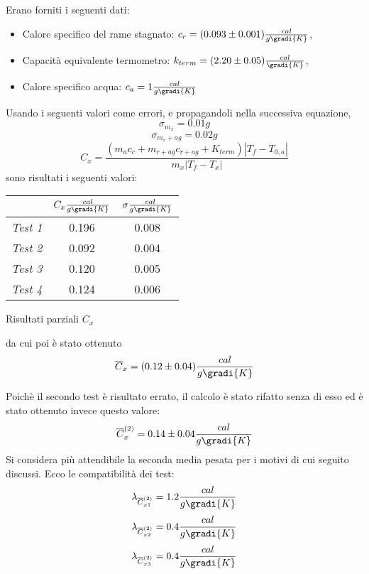 Erano forniti i seguenti dati:
\begin{itemize}
 \item Calore specifico del rame stagnato: $c_r = (0.093 \pm  0.001) \frac{cal}{g \gradi{K}}$,
 \item Capacità equivalente termometro: $k_{term} = (2.20 \pm 0.05) \frac{cal}{\gradi{K}}$,
 \item Calore specifico acqua: $c_a = 1 \frac{cal}{g \gradi{K}}$
\end{itemize}
Usando i seguenti valori come errori, e propagandoli nella successiva equazione,
\[\sigma _{m_x} = 0.01 g \]
\[\sigma_{m_r+ag} = 0.02 g \]
\begin{equation}
 C_x = \frac{(m_a c_c + m_{r+ag} c_{r+ag} + K_{term}) |T_f - T_{0,a}|}{m_x |T_f - T_x|}
\end{equation}
sono risultati i seguenti valori:
\begin{tabella}
	\centering
	
	\begin{tabular}{ccc}
	    \toprule
	    & $C_x \frac{cal}{g \gradi{K}}$ & $\sigma \frac{cal}{g \gradi{K}}$  \\ \midrule
	    \emph{Test 1} & 0.196 & 0.008  \\ \midrule
	    \emph{Test 2} & 0.092 & 0.004  \\ \midrule
	    \emph{Test 3} & 0.120 & 0.005  \\ \midrule
	    \emph{Test 4} & 0.124 & 0.006  \\ 
	    \bottomrule
	\end{tabular}
	
	\caption{Risultati parziali $C_x$}
	\label{tab:ad}
\end{tabella}
da cui poi è stato ottenuto
\begin{equation}
\overline{C}_x = (0.12 \pm 0.04) \frac{cal}{g \gradi{K}}
\end{equation}

Poichè il secondo test è risultato errato, il calcolo è stato rifatto senza di esso ed è stato ottenuto invece questo valore:
\begin{equation}
  \overline{C}_x^{(2)} = 0.14 \pm 0.04 \frac{cal}{g \gradi{K}}
\end{equation}
Si considera più attendibile la seconda media pesata per i motivi di cui seguito discussi.
Ecco le compatibilità dei test:
\[\lambda_{\overline{C}^{(2)}_{x1}} = 1.2 \frac{cal}{g \gradi{K}} \]
\[\lambda_{\overline{C}^{(2)}_{x2}} = 0.4 \frac{cal}{g \gradi{K}} \]
\[\lambda_{\overline{C}^{(2)}_{x3}} = 0.4 \frac{cal}{g \gradi{K}} \]

